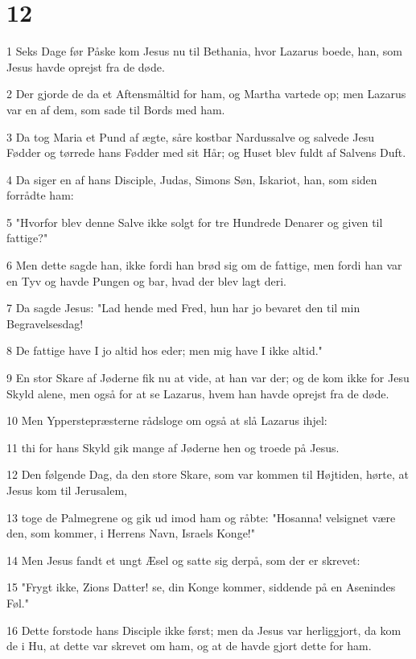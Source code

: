 \chapter{12}

\par 1 Seks Dage før Påske kom Jesus nu til Bethania, hvor Lazarus boede, han, som Jesus havde oprejst fra de døde.
\par 2 Der gjorde de da et Aftensmåltid for ham, og Martha vartede op; men Lazarus var en af dem, som sade til Bords med ham.
\par 3 Da tog Maria et Pund af ægte, såre kostbar Nardussalve og salvede Jesu Fødder og tørrede hans Fødder med sit Hår; og Huset blev fuldt af Salvens Duft.
\par 4 Da siger en af hans Disciple, Judas, Simons Søn, Iskariot, han, som siden forrådte ham:
\par 5 "Hvorfor blev denne Salve ikke solgt for tre Hundrede Denarer og given til fattige?"
\par 6 Men dette sagde han, ikke fordi han brød sig om de fattige, men fordi han var en Tyv og havde Pungen og bar, hvad der blev lagt deri.
\par 7 Da sagde Jesus: "Lad hende med Fred, hun har jo bevaret den til min Begravelsesdag!
\par 8 De fattige have I jo altid hos eder; men mig have I ikke altid."
\par 9 En stor Skare af Jøderne fik nu at vide, at han var der; og de kom ikke for Jesu Skyld alene, men også for at se Lazarus, hvem han havde oprejst fra de døde.
\par 10 Men Ypperstepræsterne rådsloge om også at slå Lazarus ihjel:
\par 11 thi for hans Skyld gik mange af Jøderne hen og troede på Jesus.
\par 12 Den følgende Dag, da den store Skare, som var kommen til Højtiden, hørte, at Jesus kom til Jerusalem,
\par 13 toge de Palmegrene og gik ud imod ham og råbte: "Hosanna! velsignet være den, som kommer, i Herrens Navn, Israels Konge!"
\par 14 Men Jesus fandt et ungt Æsel og satte sig derpå, som der er skrevet:
\par 15 "Frygt ikke, Zions Datter! se, din Konge kommer, siddende på en Asenindes Føl."
\par 16 Dette forstode hans Disciple ikke først; men da Jesus var herliggjort, da kom de i Hu, at dette var skrevet om ham, og at de havde gjort dette for ham.
